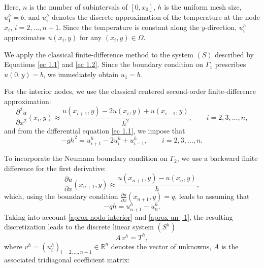 \documentclass[11pt]{article}
\begin{document}
        
 {
Here, $n$ is the number of subintervals of $[0,x_0]$, $h$ is the uniform mesh size, $u^h_1=b$, and $u^h_i$ denotes the discrete approximation of the temperature at the node $x_i$, $i=2,\ldots,n+1$. Since the temperature is constant along the $y$-direction, $u^h_i$ approximates $u(x_i,y)$ for any $(x_i,y)\in\Omega$.
}

We apply the classical finite-difference method to the system $(S)$ described by \mbox{Equations} \eqref{ec 1.1} and \eqref{ec 1.2}.
Since the boundary condition on $\Gamma_1$ prescribes $u(0,y)=b$, we immediately obtain $u_1=b$.

For the interior nodes, we use the classical centered second-order finite-difference approximation:
\begin{equation}\label{aprox-deriv}
\frac{\partial^2 u}{\partial x^2}(x_i,y)\approx 
\frac{u(x_{i+1},y)-2u(x_i,y)+u(x_{i-1},y)}{h^2},
\qquad i=2,3,\ldots,n,
\end{equation}
and from {the differential equation} \eqref{ec 1.1}, {we impose that}
\begin{equation}\label{aprox-nodo-interior}
-gh^{2}= {u^h_{i+1}}-2{u^h_i}+{u^h_{i-1}},
\qquad i=2,3,\ldots,n.
\end{equation}


To incorporate the Neumann boundary condition on $\Gamma_2$,  we use a backward finite difference for the first derivative:
\begin{equation}\label{aprox-Neumann}
\frac{\partial u}{\partial x}(x_{n+1},y)\approx 
\frac{u(x_{n+1},y)-u(x_{n},y)}{h},
\end{equation}
which, using the boundary condition 
\(\frac{\partial u}{\partial x}(x_{n+1},y)=q\),
leads to {assuming that}
\begin{equation}\label{aprox-un+1}
-qh = {u^h_{n+1}} - {u^h_{n}}.
\end{equation}
{Taking into account  \eqref{aprox-nodo-interior} and \eqref{aprox-un+1}, the resulting discretization leads to the} discrete linear system ${(S^h)}$
\begin{equation}\label{sistema-tradicional}
{A\,v^h = T^h,}
\end{equation}
where ${v^h} = ({u^h_i})_{i=2,\ldots,n+1}\in\mathbb{R}^{n}$ {denotes} the vector of unknowns, $A$ is the associated tridiagonal coefficient matrix:
\end{document}
